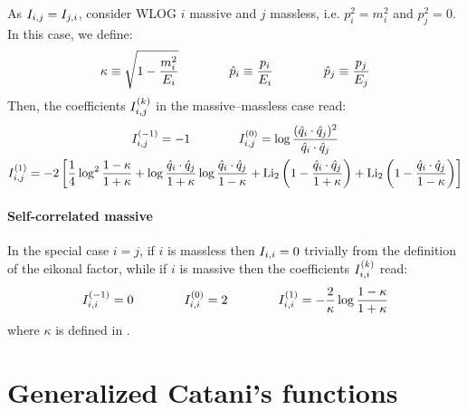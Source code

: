As $ I_{i,j} = I_{j,i} $, consider WLOG $ i $ massive and $ j $ massless, i.e. $ p_i^2 = m_i^2 $ and $ p_j^2 = 0 $. In this case, we define:
\begin{equation}
  \kappa \equiv \sqrt{1 - \frac{m_i^2}{E_i}}
  \qquad \qquad
  \hat{p}_i \equiv \frac{p_i}{E_i}
  \qquad \qquad
  \hat{p}_j \equiv \frac{p_j}{E_j}
  \label{eq:kappa-def}
\end{equation}
Then, the coefficients $ I_{i,j}^{(k)} $ in the massive--massless case read:
\begin{equation}
  \begin{gathered}
    I_{i,j}^{(-1)} = -1
    \qquad \qquad
    I_{i,j}^{(0)} = \log \frac{(\hat{q}_i \cdot \hat{q}_j)^2}{\hat{q}_i \cdot \hat{q}_j}
    \\
    I_{i,j}^{(1)} = -2 \left[ \frac{1}{4} \log^2 \frac{1 - \kappa}{1 + \kappa} + \log \frac{\hat{q}_i \cdot \hat{q}_j}{1 + \kappa} \log \frac{\hat{q}_i \cdot \hat{q}_j}{1 - \kappa} + \operatorname{Li_2} \left( 1 - \frac{\hat{q}_i \cdot \hat{q}_j}{1 + \kappa} \right) + \operatorname{Li_2} \left( 1 - \frac{\hat{q}_i \cdot \hat{q}_j}{1 - \kappa} \right) \right]
  \end{gathered}
  \label{eq:i-mnm}
\end{equation}

\paragraph{Self-correlated massive}

In the special case $ i = j $, if $ i $ is massless then $ I_{i,i} = 0 $ trivially from the definition of the eikonal factor, while if $ i $ is massive then the coefficients $ I_{i,i}^{(k)} $ read:
\begin{equation}
  I_{i,i}^{(-1)} = 0
  \qquad \qquad
  I_{i,i}^{(0)} = 2
  \qquad \qquad
  I_{i,i}^{(1)} = - \frac{2}{\kappa} \log \frac{1 - \kappa}{1 + \kappa}
  \label{eq:i-self}
\end{equation}
where $ \kappa $ is defined in .

\section{Generalized Catani's functions}
\label{sec:cat-fun}

